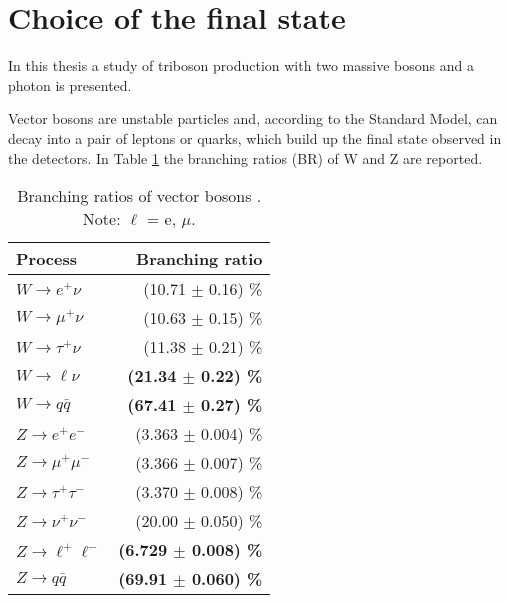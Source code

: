 \section{Choice of the final state}
In this thesis a study of triboson production with two massive bosons and a photon is presented.

Vector bosons are unstable particles and, according to the Standard Model, can decay into a pair of leptons or quarks,
which build up the final state observed in the detectors.
In Table \ref{tab:VB-BR} the branching ratios (BR) of W and Z are reported.

\begin{table}
  \centering
  \caption{Branching ratios of vector bosons \cite{Workman:2022ynf}. Note: $\ell$ = e, $\mu$.}
  \label{tab:VB-BR}
  \begin{tabular}{ l r } %
    \hline
    Process & Branching ratio \\
    \hline
    $W \rightarrow e^+ \nu               $ &         (10.71 $\pm$ 0.16) \% \\
    $W \rightarrow \mu^+ \nu             $ &         (10.63 $\pm$ 0.15) \% \\
    $W \rightarrow \tau^+ \nu            $ &         (11.38 $\pm$ 0.21) \% \\
    \boldmath$W \rightarrow \ell \nu     $ & \textbf{(21.34 $\pm$ 0.22) \%}\\
    \boldmath$W \rightarrow q\bar{q}     $ & \textbf{(67.41 $\pm$ 0.27) \%}\\
    \hline
    $Z \rightarrow e^+ e^-               $ &         (3.363 $\pm$ 0.004) \% \\
    $Z \rightarrow \mu^+ \mu^-           $ &         (3.366 $\pm$ 0.007) \% \\
    $Z \rightarrow \tau^+ \tau^-         $ &         (3.370 $\pm$ 0.008) \% \\
    $Z \rightarrow \nu^+ \nu^-           $ &         (20.00 $\pm$ 0.050) \% \\
    \boldmath$Z \rightarrow \ell^+ \ell^-$ & \textbf{(6.729 $\pm$ 0.008) \%}\\
    \boldmath$Z \rightarrow q\bar{q}     $ & \textbf{(69.91 $\pm$ 0.060) \%}\\
    \hline
  \end{tabular}
\end{table}


